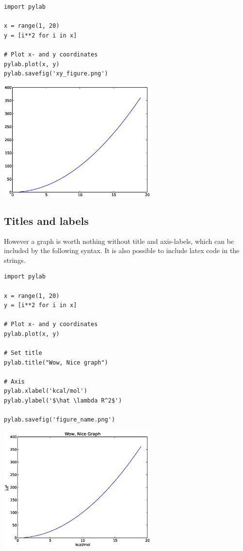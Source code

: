 \documentclass{article}
\begin{document}
\begin{multicols}{2}

\begin{lstlisting}
import pylab

x = range(1, 20)
y = [i**2 for i in x]

# Plot x- and y coordinates
pylab.plot(x, y)
pylab.savefig('xy_figure.png')

\end{lstlisting}
\columnbreak
\includegraphics[width=0.6\textwidth]{py/xy_figure.eps}
\end{multicols}


\newpage
\subsection{Titles and labels}

However a graph is worth nothing without title and axis-labels,
which can be included by the following syntax.
It is also possible to include latex code in the strings.

\begin{multicols}{2}

\begin{lstlisting}
import pylab

x = range(1, 20)
y = [i**2 for i in x]

# Plot x- and y coordinates
pylab.plot(x, y)

# Set title
pylab.title("Wow, Nice graph")

# Axis
pylab.xlabel('kcal/mol')
pylab.ylabel('$\hat \lambda R^2$')

pylab.savefig('figure_name.png')
\end{lstlisting}
\columnbreak
\includegraphics[width=0.6\textwidth]{py/figure_title.eps}
\end{multicols}
\end{document}
